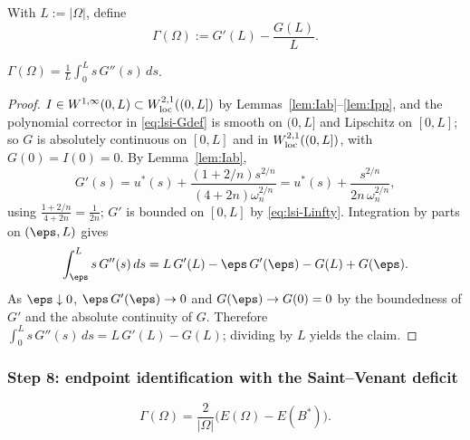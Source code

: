 With $L:=|\Omega|$, define
\begin{equation}\label{eq:lsi-Gammadef}
   \Gamma(\Omega):=G'(L)-\frac{G(L)}{L}.
\end{equation}

\begin{lemma}\label{lem:Gamma}
$\displaystyle\Gamma(\Omega)=\frac{1}{L}\int_{0}^{L}s\,G''(s)\,ds$.
\end{lemma}

\begin{proof}
$I\in W^{1,\infty}(0,L)\subset W^{2,1}_{\rm loc}((0,L])$ by
Lemmas~\ref{lem:Iab}--\ref{lem:Ipp}, and the polynomial corrector in
\eqref{eq:lsi-Gdef} is smooth on $(0,L]$ and Lipschitz on $[0,L]$; so $G$
is absolutely continuous on $[0,L]$ and in $W^{2,1}_{\rm loc}((0,L])$,
with $G(0)=I(0)=0$. By Lemma~\ref{lem:Iab},
\[
   G'(s)=u^{*}(s)+\frac{(1+2/n)s^{2/n}}{(4+2n)\omega_{n}^{2/n}}
        =u^{*}(s)+\frac{s^{2/n}}{2n\,\omega_{n}^{2/n}},
\]
using $\frac{1+2/n}{4+2n}=\frac{1}{2n}$; $G'$ is bounded on $[0,L]$ by
\eqref{eq:lsi-Linfty}. Integration by parts on $(\eps,L)$ gives
\[
   \int_{\eps}^{L}s\,G''(s)\,ds
   =L\,G'(L)-\eps\,G'(\eps)-G(L)+G(\eps).
\]
As $\eps\downarrow 0$, $\eps\,G'(\eps)\to 0$ and $G(\eps)\to G(0)=0$ by
the boundedness of $G'$ and the absolute continuity of $G$. Therefore
$\int_{0}^{L}s\,G''(s)\,ds=L\,G'(L)-G(L)$; dividing by $L$ yields the
claim.
\end{proof}

\subsubsection{Step 8: endpoint identification with the Saint--Venant
deficit}
\label{sssec:lsi-endpoint}

\begin{lemma}\label{lem:endpoint}
\begin{equation}\label{eq:lsi-endpoint}
   \Gamma(\Omega)=\frac{2}{|\Omega|}\bigl(E(\Omega)-E(B^{*})\bigr).
\end{equation}
\end{lemma}

